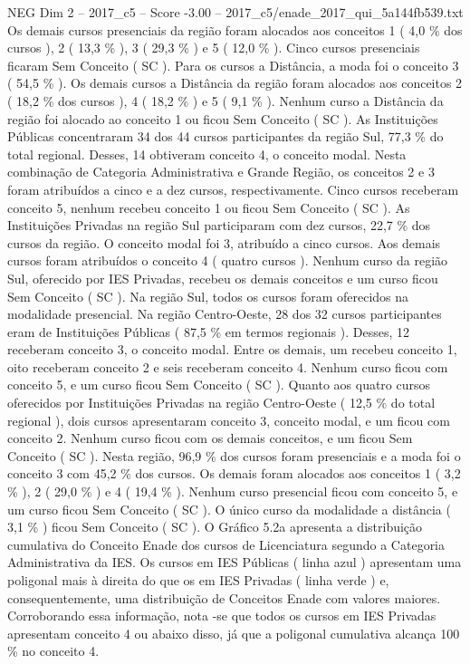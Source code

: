 \begin{textsample}{NEG Dim 2 – 2017\_c5 – Score -3.00 – 2017\_c5/enade\_2017\_qui\_5a144fb539.txt}
Os demais cursos presenciais da região foram alocados aos conceitos 1 ( 4,0 \% dos cursos ), 2 ( 13,3 \% ), 3 ( 29,3 \% ) e 5 ( 12,0 \% ).
Cinco cursos presenciais ficaram Sem Conceito ( SC ).
Para os cursos a Distância, a moda foi o conceito 3 ( 54,5 \% ).
Os demais cursos a Distância da região foram alocados aos conceitos 2 ( 18,2 \% dos cursos ), 4 ( 18,2 \% ) e 5 ( 9,1 \% ).
Nenhum curso a Distância da região foi alocado ao conceito 1 ou ficou Sem Conceito ( SC ).
As Instituições Públicas concentraram 34 dos 44 cursos participantes da região Sul, 77,3 \% do total regional.
Desses, 14 obtiveram conceito 4, o conceito modal.
Nesta combinação de Categoria Administrativa e Grande Região, os conceitos 2 e 3 foram atribuídos a cinco e a dez cursos, respectivamente.
Cinco cursos receberam conceito 5, nenhum recebeu conceito 1 ou ficou Sem Conceito ( SC ).
As Instituições Privadas na região Sul participaram com dez cursos, 22,7 \% dos cursos da região.
O conceito modal foi 3, atribuído a cinco cursos.
Aos demais cursos foram atribuídos o conceito 4 ( quatro cursos ).
Nenhum curso da região Sul, oferecido por IES Privadas, recebeu os demais conceitos e um curso ficou Sem Conceito ( SC ).
Na região Sul, todos os cursos foram oferecidos na modalidade presencial.
Na região Centro-Oeste, 28 dos 32 cursos participantes eram de Instituições Públicas ( 87,5 \% em termos regionais ).
Desses, 12 receberam conceito 3, o conceito modal.
Entre os demais, um recebeu conceito 1, oito receberam conceito 2 e seis receberam conceito 4.
Nenhum curso ficou com conceito 5, e um curso ficou Sem Conceito ( SC ).
Quanto aos quatro cursos oferecidos por Instituições Privadas na região Centro-Oeste ( 12,5 \% do total regional ), dois cursos apresentaram conceito 3, conceito modal, e um ficou com conceito 2.
Nenhum curso ficou com os demais conceitos, e um ficou Sem Conceito ( SC ).
Nesta região, 96,9 \% dos cursos foram presenciais e a moda foi o conceito 3 com 45,2 \% dos cursos.
Os demais foram alocados aos conceitos 1 ( 3,2 \% ), 2 ( 29,0 \% ) e 4 ( 19,4 \% ).
Nenhum curso presencial ficou com conceito 5, e um curso ficou Sem Conceito ( SC ).
O único curso da modalidade a distância ( 3,1 \% ) ficou Sem Conceito ( SC ).
O Gráfico 5.2a apresenta a distribuição cumulativa do Conceito Enade dos cursos de Licenciatura segundo a Categoria Administrativa da IES.
Os cursos em IES Públicas ( linha azul ) apresentam uma poligonal mais à direita do que os em IES Privadas ( linha verde ) e, consequentemente, uma distribuição de Conceitos Enade com valores maiores.
Corroborando essa informação, nota -se que todos os cursos em IES Privadas apresentam conceito 4 ou abaixo disso, já que a poligonal cumulativa alcança 100 \% no conceito 4.

\end{textsample}
